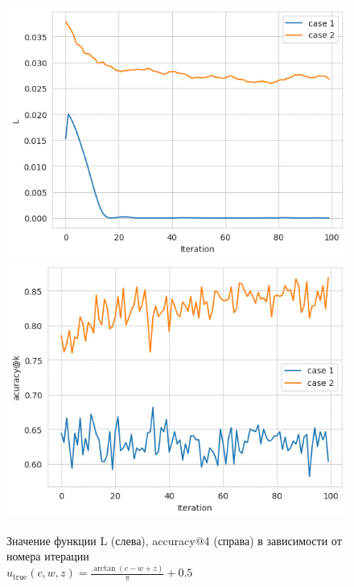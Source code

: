 \documentclass{article}
\begin{document}
\begin{figure}[h!]
    \centering
    \includegraphics[width=0.49\linewidth]{images/loss.jpg}
    \includegraphics[width=0.49\linewidth]{images/case1_csae2.jpg}

    \caption{Значение функции L (слева), accuracy@4 (справа) в зависимости от номера итерации \\
    $u_{\text{true}}(c, w, z) = \frac{\arctan(c - w + z)}{\pi} + 0.5$}
    \label{accuracis}
\end{figure}



\end{document}
